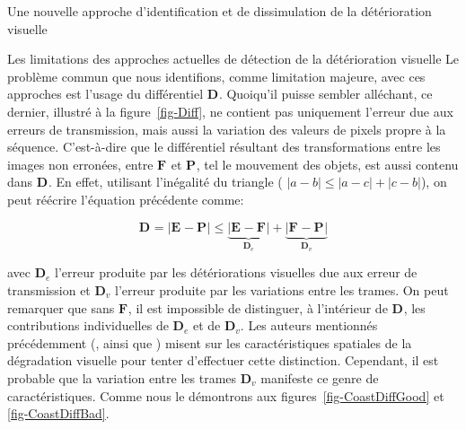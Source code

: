 \documentclass[letterpaper, twoside, 12pt,memoire]{thETS}
\newcommand{\fig}[1]{figure~\ref{#1}}
\newcommand{\ltF}[1]{\mathbf{F}_{#1}}
\newcommand{\ltE}[1]{\mathbf{E}_{#1}}
\newcommand{\ltP}[1]{\mathbf{P}_{#1}}
\newcommand{\ltD}[1]{\mathbf{D}_{#1}}
\begin{document}
\begin{chapter}{Une nouvelle approche d'identification et de dissimulation de la
détérioration visuelle}
\begin{section}{Les limitations des approches actuelles de détection de la
détérioration visuelle}
Le problème commun que nous identifions, comme limitation majeure, avec ces
approches est l'usage du différentiel $\ltD{}$. Quoiqu'il puisse sembler
alléchant, ce dernier, illustré à la \fig{fig-Diff}, ne contient pas uniquement
l'erreur due aux erreurs de transmission, mais aussi la variation des valeurs de pixels propre à la séquence.
C'est-à-dire que le différentiel résultant des transformations entre les images non erronées, 
entre $\ltF{}$ et $\ltP{}$, tel le mouvement des objets, est aussi contenu dans $\ltD{}$. En effet, utilisant l'inégalité du triangle ( $\left|a-b\right| \le\left|a-c\right| + \left|c-b\right| $), on peut réécrire l'équation précédente comme:

\begin{equation}
\ltD{}= \left|\ltE{}-\ltP{}\right| \le   \underbrace{ \left|\ltE{}-\ltF{}\right|}_{\ltD{e}} +   \underbrace{ \left|\ltF{}-\ltP{}\right|}_{\ltD{v}} 
\end{equation}

avec $\ltD{e}$ l'erreur produite par les détériorations visuelles due aux erreur de transmission et $\ltD{v}$ l'erreur produite par les variations entre les trames.  On peut remarquer que sans $\ltF{}$, il est impossible de distinguer, à l'intérieur
de $\ltD{}$, les contributions individuelles de $\ltD{e}$ et de $\ltD{v}$. Les auteurs mentionnés précédemment (\citet{Superiori2007},
\citet{Ikuno2007} ainsi que \citet{Farrugia2008}) misent sur les
caractéristiques spatiales de la dégradation visuelle pour tenter d'effectuer
cette distinction. Cependant, il est probable que la variation entre les trames
$\ltD{v}$ manifeste ce genre de caractéristiques. Comme nous le démontrons
aux figures~\ref{fig-CoastDiffGood} et \ref{fig-CoastDiffBad}.


\end{section}
\end{chapter}
\end{document}
